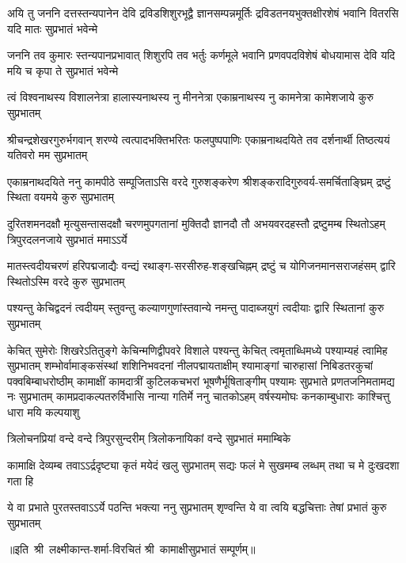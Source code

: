 \fourlineindentedshloka
{अयि तु जननि दत्तस्तन्यपानेन देवि}
{द्रविडशिशुरभूद्वै ज्ञानसम्पन्नमूर्तिः}
{द्रविडतनयभुक्तक्षीरशेषं भवानि}
{वितरसि यदि मातः सुप्रभातं भवेन्मे}

\fourlineindentedshloka
{जननि तव कुमारः स्तन्यपानप्रभावात्}
{शिशुरपि तव भर्तुः कर्णमूले भवानि}
{प्रणवपदविशेषं बोधयामास देवि}
{यदि मयि च कृपा ते सुप्रभातं भवेन्मे}

\fourlineindentedshloka
{त्वं विश्वनाथस्य विशालनेत्रा}
{हालास्यनाथस्य नु मीननेत्रा}
{एकाम्रनाथस्य नु कामनेत्रा}
{कामेशजाये कुरु सुप्रभातम्}

\fourlineindentedshloka
{श्रीचन्द्रशेखरगुरुर्भगवान् शरण्ये}
{त्वत्पादभक्तिभरितः फलपुष्पपाणिः}
{एकाम्रनाथदयिते तव दर्शनार्थी}
{तिष्ठत्ययं यतिवरो मम सुप्रभातम्}

\fourlineindentedshloka
{एकाम्रनाथदयिते ननु कामपीठे}
{सम्पूजिताऽसि वरदे गुरुशङ्करेण}
{श्रीशङ्करादिगुरुवर्य-समर्चिताङ्घ्रिम्}
{द्रष्टुं स्थिता वयमये कुरु सुप्रभातम्}

\fourlineindentedshloka
{दुरितशमनदक्षौ मृत्युसन्तासदक्षौ}
{चरणमुपगतानां मुक्तिदौ ज्ञानदौ तौ}
{अभयवरदहस्तौ द्रष्टुमम्ब स्थितोऽहम्}
{त्रिपुरदलनजाये सुप्रभातं ममाऽऽर्ये}

\fourlineindentedshloka
{मातस्त्वदीयचरणं हरिपद्मजाद्यैः}
{वन्द्यं रथाङ्ग-सरसीरुह-शङ्खचिह्नम्}
{द्रष्टुं च योगिजनमानसराजहंसम्}
{द्वारि स्थितोऽस्मि वरदे कुरु सुप्रभातम्}

\fourlineindentedshloka
{पश्यन्तु केचिद्वदनं त्वदीयम्}
{स्तुवन्तु कल्याणगुणांस्तवान्ये}
{नमन्तु पादाब्जयुगं त्वदीयाः}
{द्वारि स्थितानां कुरु सुप्रभातम्}

\fourlineindentedshloka
{केचित् सुमेरोः शिखरेऽतितुङ्गे}
{केचिन्मणिद्वीपवरे विशाले}
{पश्यन्तु केचित् त्वमृताब्धिमध्ये}
{पश्याम्यहं त्वामिह सुप्रभातम्}
\setlength{\shlokaspaceskip}{16pt}
\fourlineindentedshloka
{शम्भोर्वामाङ्कसंस्थां शशिनिभवदनां नीलपद्मायताक्षीम्}
{श्यामाङ्गां चारुहासां निबिडतरकुचां पक्वबिम्बाधरोष्ठीम्}
{कामाक्षीं कामदात्रीं कुटिलकचभरां भूषणैर्भूषिताङ्गीम्}
{पश्यामः सुप्रभाते प्रणतजनिमतामद्य नः सुप्रभातम्}
\setlength{\shlokaspaceskip}{24pt}
\fourlineindentedshloka
{कामप्रदाकल्पतरुर्विभासि}
{नान्या गतिर्मे ननु चातकोऽहम्}
{वर्षस्यमोघः कनकाम्बुधाराः}
{काश्चित्तु धारा मयि कल्पयाशु}

\twolineshloka
{त्रिलोचनप्रियां वन्दे वन्दे त्रिपुरसुन्दरीम्}
{त्रिलोकनायिकां वन्दे सुप्रभातं ममाम्बिके}

\fourlineindentedshloka
{कामाक्षि देव्यम्ब तवाऽऽर्द्रदृष्ट्या}
{कृतं मयेदं खलु सुप्रभातम्}
{सद्यः फलं मे सुखमम्ब लब्धम्}
{तथा च मे दुःखदशा गता हि}

\fourlineindentedshloka
{ये वा प्रभाते पुरतस्तवाऽऽर्ये}
{पठन्ति भक्त्या ननु सुप्रभातम्}
{शृण्वन्ति ये वा त्वयि बद्धचित्ताः}
{तेषां प्रभातं कुरु सुप्रभातम्}

॥इति~श्री~लक्ष्मीकान्त-शर्मा-विरचितं श्री~कामाक्षीसुप्रभातं सम्पूर्णम्॥